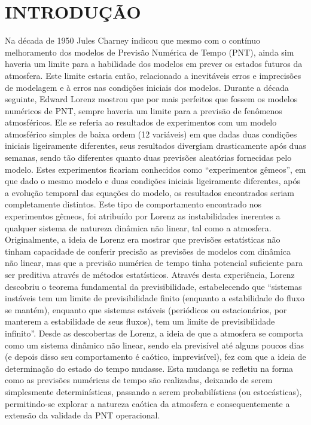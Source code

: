 \chapter{INTRODUÇÃO}
\label{introducao}

Na década de 1950 Jules Charney indicou que mesmo com o contínuo melhoramento dos modelos de Previsão Numérica de Tempo (PNT), ainda sim haveria um limite para a habilidade dos modelos em prever os estados futuros da atmosfera. Este limite estaria então, relacionado a inevitáveis erros e imprecisões de modelagem e à erros nas condições iniciais dos modelos. Durante a década seguinte, Edward Lorenz mostrou que por mais perfeitos que fossem os modelos numéricos de PNT, sempre haveria um limite para a previsão de fenômenos atmosféricos. Ele se referia ao resultados de experimentos com um modelo atmosférico simples de baixa ordem (12 variáveis) em que dadas duas condições iniciais ligeiramente diferentes, seus resultados divergiam drasticamente após duas semanas, sendo tão diferentes quanto duas previsões aleatórias fornecidas pelo modelo. Estes experimentos ficariam conhecidos como ``experimentos gêmeos'', em que dado o mesmo modelo e duas condições iniciais ligeiramente diferentes, após a evolução temporal das equações do modelo, os resultados encontrados seriam completamente distintos. Este tipo de comportamento encontrado nos experimentos gêmeos, foi atribuído por Lorenz as instabilidades inerentes a qualquer sistema de natureza dinâmica não linear, tal como a atmosfera. Originalmente, a ideia de Lorenz era mostrar que previsões estatísticas não tinham capacidade de conferir precisão as previsões de modelos com dinâmica não linear, mas que a previsão numérica de tempo tinha potencial suficiente para ser preditiva através de métodos estatísticos. Através desta experiência, Lorenz descobriu o teorema fundamental da previsibilidade, estabelecendo que ``sistemas instáveis tem um limite de previsibilidade finito (enquanto a estabilidade do fluxo se mantém), enquanto que sistemas estáveis (periódicos ou estacionários, por manterem a estabilidade de seus fluxos), tem um limite de previsibilidade infinito''. Desde as descobertas de Lorenz, a ideia de que a atmosfera se comporta como um sistema dinâmico não linear, sendo ela previsível até alguns poucos dias (e depois disso seu comportamento é caótico, imprevisível), fez com que a ideia de determinação do estado do tempo mudasse. Esta mudança se refletiu na forma como as previsões numéricas de tempo são realizadas, deixando de serem simplesmente determinísticas, passando a serem probabilísticas (ou estocásticas), permitindo-se explorar a natureza caótica da atmosfera e consequentemente a extensão da validade da PNT operacional.

